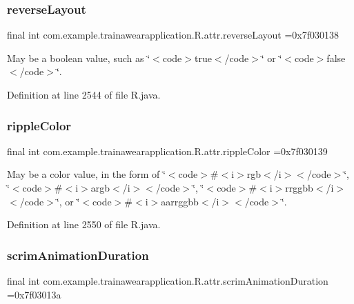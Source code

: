 \subsubsection{\texorpdfstring{reverseLayout}{reverseLayout}}
{\footnotesize\ttfamily final int com.\+example.\+trainawearapplication.\+R.\+attr.\+reverse\+Layout =0x7f030138\hspace{0.3cm}{\ttfamily [static]}}

May be a boolean value, such as \char`\"{}$<$code$>$true$<$/code$>$\char`\"{} or \char`\"{}$<$code$>$false$<$/code$>$\char`\"{}. 

Definition at line 2544 of file R.\+java.

\mbox{\label{classcom_1_1example_1_1trainawearapplication_1_1_r_1_1attr_ae6841bc6f6df7ff2d82a9ce33347745c}} 
\subsubsection{\texorpdfstring{rippleColor}{rippleColor}}
{\footnotesize\ttfamily final int com.\+example.\+trainawearapplication.\+R.\+attr.\+ripple\+Color =0x7f030139\hspace{0.3cm}{\ttfamily [static]}}

May be a color value, in the form of \char`\"{}$<$code$>$\#$<$i$>$rgb$<$/i$>$$<$/code$>$\char`\"{}, \char`\"{}$<$code$>$\#$<$i$>$argb$<$/i$>$$<$/code$>$\char`\"{}, \char`\"{}$<$code$>$\#$<$i$>$rrggbb$<$/i$>$$<$/code$>$\char`\"{}, or \char`\"{}$<$code$>$\#$<$i$>$aarrggbb$<$/i$>$$<$/code$>$\char`\"{}. 

Definition at line 2550 of file R.\+java.

\mbox{\label{classcom_1_1example_1_1trainawearapplication_1_1_r_1_1attr_a38b74637a2ac4b4440002d246e97a35f}} 
\subsubsection{\texorpdfstring{scrimAnimationDuration}{scrimAnimationDuration}}
{\footnotesize\ttfamily final int com.\+example.\+trainawearapplication.\+R.\+attr.\+scrim\+Animation\+Duration =0x7f03013a\hspace{0.3cm}{\ttfamily [static]}}

